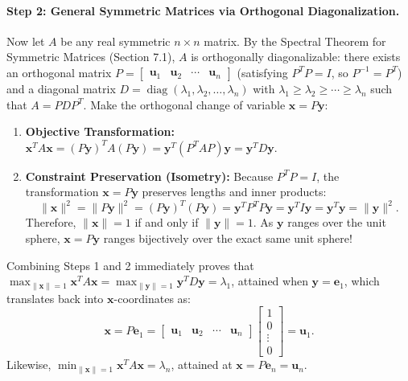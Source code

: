 \documentclass[11pt, letterpaper]{article}
\theoremstyle{definition}
\theoremstyle{remark}
\begin{document}
\paragraph{Step 2: General Symmetric Matrices via Orthogonal Diagonalization.}
Now let $A$ be any real symmetric $n \times n$ matrix. By the Spectral Theorem for Symmetric Matrices (Section 7.1), $A$ is orthogonally diagonalizable: there exists an orthogonal matrix $P = \begin{bmatrix} \mathbf{u}_1 & \mathbf{u}_2 & \cdots & \mathbf{u}_n \end{bmatrix}$ (satisfying $P^T P = I$, so $P^{-1} = P^T$) and a diagonal matrix $D = \operatorname{diag}(\lambda_1, \lambda_2, \dots, \lambda_n)$ with $\lambda_1 \ge \lambda_2 \ge \cdots \ge \lambda_n$ such that $A = P D P^T$. Make the orthogonal change of variable $\mathbf{x} = P\mathbf{y}$:
\begin{enumerate}[leftmargin=2em]
    \item \textbf{Objective Transformation:} $\mathbf{x}^T A \mathbf{x} = (P\mathbf{y})^T A (P\mathbf{y}) = \mathbf{y}^T (P^T A P) \mathbf{y} = \mathbf{y}^T D \mathbf{y}$.
    \item \textbf{Constraint Preservation (Isometry):} Because $P^T P = I$, the transformation $\mathbf{x} = P\mathbf{y}$ preserves lengths and inner products:
    \[
    \|\mathbf{x}\|^2 = \|P\mathbf{y}\|^2 = (P\mathbf{y})^T (P\mathbf{y}) = \mathbf{y}^T P^T P \mathbf{y} = \mathbf{y}^T I \mathbf{y} = \mathbf{y}^T \mathbf{y} = \|\mathbf{y}\|^2.
    \]
    Therefore, $\|\mathbf{x}\| = 1$ if and only if $\|\mathbf{y}\| = 1$. As $\mathbf{y}$ ranges over the unit sphere, $\mathbf{x} = P\mathbf{y}$ ranges bijectively over the exact same unit sphere!
\end{enumerate}
Combining Steps 1 and 2 immediately proves that $\max_{\|\mathbf{x}\|=1} \mathbf{x}^T A \mathbf{x} = \max_{\|\mathbf{y}\|=1} \mathbf{y}^T D \mathbf{y} = \lambda_1$, attained when $\mathbf{y} = \mathbf{e}_1$, which translates back into $\mathbf{x}$-coordinates as:
\[
\mathbf{x} = P\mathbf{e}_1 = \begin{bmatrix} \mathbf{u}_1 & \mathbf{u}_2 & \cdots & \mathbf{u}_n \end{bmatrix} \begin{bmatrix} 1 \\ 0 \\ \vdots \\ 0 \end{bmatrix} = \mathbf{u}_1.
\]
Likewise, $\min_{\|\mathbf{x}\|=1} \mathbf{x}^T A \mathbf{x} = \lambda_n$, attained at $\mathbf{x} = P\mathbf{e}_n = \mathbf{u}_n$.
\end{document}
